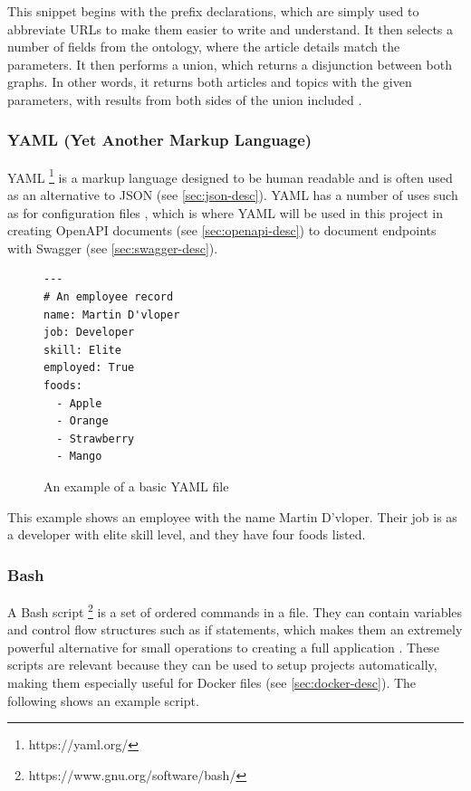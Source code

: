 \documentclass[12pt, letterpaper]{article}
\begin{document}
\begin{flushleft}
This snippet begins with the prefix declarations, which are simply used to abbreviate URLs to make them easier to write and understand. It then selects a number of fields from the ontology, where the article details match the parameters. It then performs a union, which returns a disjunction between both graphs. In other words, it returns both articles and topics with the given parameters, with results from both sides of the union included \cite{sparql-syntax}.
\end{flushleft}

\subsubsection{YAML (Yet Another Markup Language)}\label{sec:yaml-desc}

\begin{flushleft}
YAML \footnote{https://yaml.org/} is a markup language designed to be human readable and is often used as an alternative to JSON (see \ref{sec:json-desc}). YAML has a number of uses such as for configuration files \cite{yaml-desc}, which is where YAML will be used in this project in creating OpenAPI documents (see \ref{sec:openapi-desc}) to document endpoints with Swagger (see \ref{sec:swagger-desc}).
\end{flushleft}

\begin{flushleft}
\begin{figure}[H]
\begin{verbatim}
---
# An employee record
name: Martin D'vloper
job: Developer
skill: Elite
employed: True
foods:
  - Apple
  - Orange
  - Strawberry
  - Mango
\end{verbatim}
\caption{An example of a basic YAML file \cite{yaml-desc}}
\end{figure}
\end{flushleft}

\begin{flushleft}
This example shows an employee with the name Martin D'vloper. Their job is as a developer with elite skill level, and they have four foods listed.
\end{flushleft}

\subsubsection{Bash}\label{sec:bash-desc}

\begin{flushleft}
A Bash script \footnote{https://www.gnu.org/software/bash/} is a set of ordered commands in a file. They can contain variables and control flow structures such as if statements, which makes them an extremely powerful alternative for small operations to creating a full application \cite{bash-desc}. These scripts are relevant because they can be used to setup projects automatically, making them especially useful for Docker files (see \ref{sec:docker-desc}). The following shows an example script.
\end{flushleft}
\end{document}
